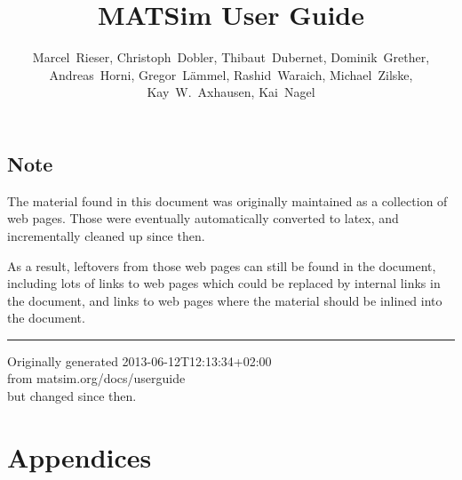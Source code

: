 \documentclass[a4paper,11pt]{report}
\newcommand{\NextFile}[1]{}
\def\umbruch{\vfill\eject}
\def\umbruch{\relax}
\begin{document}
\NextFile{index.html}

\title{MATSim User Guide}

\author{%
Marcel~Rieser, %
%
Christoph~Dobler,
Thibaut~Dubernet,
Dominik~Grether,
Andreas~Horni, 
Gregor~Lämmel,
Rashid~Waraich,
Michael~Zilske,
%
Kay~W.~Axhausen, %
Kai~Nagel %
}



\umbruch

\section*{Note}

The material found in this document was originally maintained as a collection of web pages.  Those were eventually automatically converted to latex, and incrementally cleaned up since then.  

As a result, leftovers from those web pages can still be found in the document, including lots of links to web pages which could be replaced by internal links in the document, and links to web pages where the material should be inlined into the document.
\\
\hrule

Originally generated 2013-06-12T12:13:34+02:00
\\from matsim.org/docs/userguide
\\but changed since then.



\umbruch

\tableofcontents












%

\appendix
\chapter*{Appendices}






\umbruch
\end{document}
